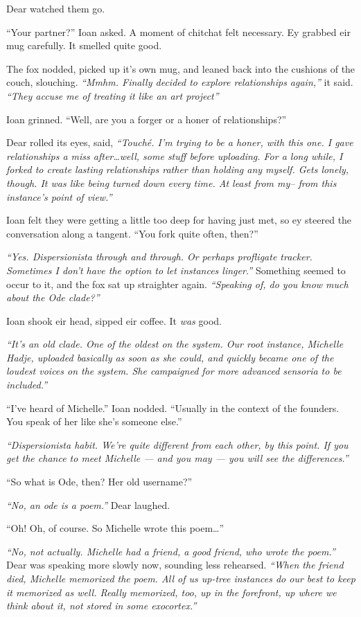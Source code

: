 Dear watched them go.

``Your partner?'' Ioan asked. A moment of chitchat felt necessary. Ey grabbed eir mug carefully. It smelled quite good.

The fox nodded, picked up it's own mug, and leaned back into the cushions of the couch, slouching. \emph{``Mmhm. Finally decided to explore relationships again,''} it said. \emph{``They accuse me of treating it like an art project''}

Ioan grinned. ``Well, are you a forger or a honer of relationships?''

Dear rolled its eyes, said, \emph{``Touché. I'm trying to be a honer, with this one. I gave relationships a miss after\ldots{}well, some stuff before uploading. For a long while, I forked to create lasting relationships rather than holding any myself. Gets lonely, though. It was like being turned down every time. At least from my-- from this instance's point of view.''}

Ioan felt they were getting a little too deep for having just met, so ey steered the conversation along a tangent. ``You fork quite often, then?''

\emph{``Yes. Dispersionista through and through. Or perhaps profligate tracker. Sometimes I don't have the option to let instances linger.''} Something seemed to occur to it, and the fox sat up straighter again. \emph{``Speaking of, do you know much about the Ode clade?''}

Ioan shook eir head, sipped eir coffee. It \emph{was} good.

\emph{``It's an old clade. One of the oldest on the system. Our root instance, Michelle Hadje, uploaded basically as soon as she could, and quickly became one of the loudest voices on the system. She campaigned for more advanced sensoria to be included.''}

``I've heard of Michelle.'' Ioan nodded. ``Usually in the context of the founders. You speak of her like she's someone else.''

\emph{``Dispersionista habit. We're quite different from each other, by this point. If you get the chance to meet Michelle — and you may — you will see the differences.''}

``So what is Ode, then? Her old username?''

\emph{``No, an ode is a poem.''} Dear laughed.

``Oh! Oh, of course. So Michelle wrote this poem\ldots{}''

\emph{``No, not actually. Michelle had a friend, a good friend, who wrote the poem.''} Dear was speaking more slowly now, sounding less rehearsed. \emph{``When the friend died, Michelle memorized the poem. All of us up-tree instances do our best to keep it memorized as well. Really memorized, too, up in the forefront, up where we think about it, not stored in some exocortex.''}

